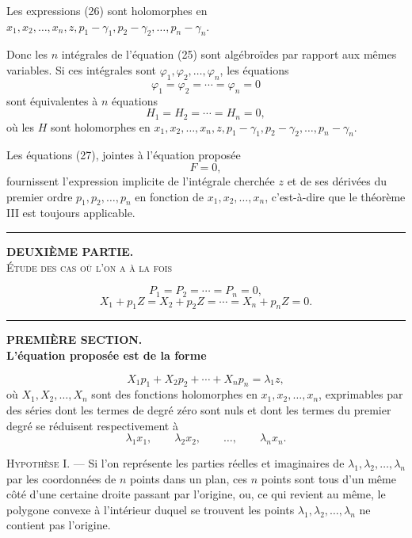 \documentclass[11pt]{article}
\newcommand{\shortline}{\begin{center}\rule{3.5em}{0.4pt}\end{center}}
\begin{document}
Les expressions (26) sont holomorphes en $x_1,x_2,\ldots,x_n,z,p_1-\gamma_1,p_2-\gamma_2,\ldots,p_n-\gamma_n$.

Donc les $n$ intégrales de l’équation (25) sont algébroïdes par rapport aux mêmes variables. Si ces intégrales sont $\varphi_1,\varphi_2,\ldots,\varphi_n$, les équations
\[
\varphi_1=\varphi_2=\cdots=\varphi_n=0
\]
sont équivalentes à $n$ équations
\begin{equation*}\tag{27}
H_1=H_2=\cdots=H_n=0,
\end{equation*}
où les $H$ sont holomorphes en $x_1,x_2,\ldots,x_n,z,p_1-\gamma_1,p_2-\gamma_2,\ldots,p_n-\gamma_n$.

Les équations (27), jointes à l’équation proposée
\[
F=0,
\]
fournissent l’expression implicite de l’intégrale cherchée $z$ et de ses dérivées du premier ordre $p_1,p_2,\ldots,p_n$ en fonction de $x_1,x_2,\ldots,x_n$, c’est-à-dire que le théorème III est toujours applicable.

\shortline

\begin{center}
{\bfseries DEUXIÈME PARTIE.}\\[0.8em]
{\scshape Étude des cas où l’on a à la fois}
\end{center}
\[
P_1=P_2=\cdots=P_n=0,
\]
\[
X_1+p_1Z=X_2+p_2Z=\cdots=X_n+p_nZ=0.
\]

\shortline

\begin{center}
{\bfseries PREMIÈRE SECTION.}\\[0.8em]
{\bfseries L’équation proposée est de la forme}
\end{center}

\begin{equation*}\tag{1}
X_1p_1+X_2p_2+\cdots+X_np_n=\lambda_1z,
\end{equation*}
où $X_1,X_2,\ldots,X_n$ sont des fonctions holomorphes en $x_1,x_2,\ldots,x_n$, exprimables par des séries dont les termes de degré zéro sont nuls et dont les termes du premier degré se réduisent respectivement à
\[
\lambda_1x_1,\qquad \lambda_2x_2,\qquad \ldots,\qquad \lambda_nx_n.
\]

\noindent\textsc{Hypothèse I.} --- Si l’on représente les parties réelles et imaginaires de $\lambda_1,\lambda_2,\ldots,\lambda_n$ par les coordonnées de $n$ points dans un plan, ces $n$ points sont tous d’un même côté d’une certaine droite passant par l’origine, ou, ce qui revient au même, le polygone convexe à l’intérieur duquel se trouvent les points $\lambda_1,\lambda_2,\ldots,\lambda_n$ ne contient pas l’origine.
\end{document}
